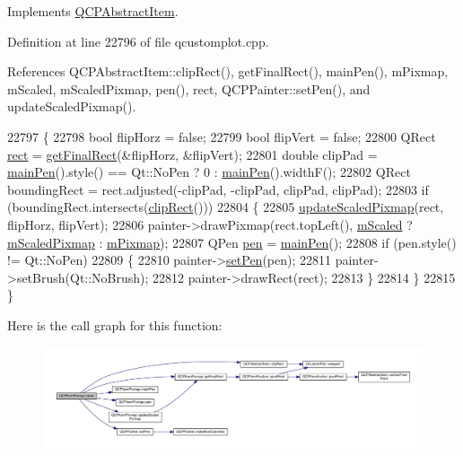 Implements \hyperlink{class_q_c_p_abstract_item_ad0dc056f650c3ca73414e6b4f01674ef}{Q\+C\+P\+Abstract\+Item}.



Definition at line 22796 of file qcustomplot.\+cpp.



References Q\+C\+P\+Abstract\+Item\+::clip\+Rect(), get\+Final\+Rect(), main\+Pen(), m\+Pixmap, m\+Scaled, m\+Scaled\+Pixmap, pen(), rect, Q\+C\+P\+Painter\+::set\+Pen(), and update\+Scaled\+Pixmap().


\begin{DoxyCode}
22797 \{
22798   \textcolor{keywordtype}{bool} flipHorz = \textcolor{keyword}{false};
22799   \textcolor{keywordtype}{bool} flipVert = \textcolor{keyword}{false};
22800   QRect \hyperlink{_gen_blob_8m_aea8f6815d9a63491fc422c5572c6b3c3}{rect} = \hyperlink{class_q_c_p_item_pixmap_a245ef0c626cab7096a810442f2f6a2d9}{getFinalRect}(&flipHorz, &flipVert);
22801   \textcolor{keywordtype}{double} clipPad = \hyperlink{class_q_c_p_item_pixmap_af21085516585c475dc9d839e7f377233}{mainPen}().style() == Qt::NoPen ? 0 : \hyperlink{class_q_c_p_item_pixmap_af21085516585c475dc9d839e7f377233}{mainPen}().widthF();
22802   QRect boundingRect = rect.adjusted(-clipPad, -clipPad, clipPad, clipPad);
22803   \textcolor{keywordflow}{if} (boundingRect.intersects(\hyperlink{class_q_c_p_abstract_item_a538e25ff8856534582f5b2b400a46405}{clipRect}()))
22804   \{
22805     \hyperlink{class_q_c_p_item_pixmap_a8bced3027b326b290726cd1979c7cfc6}{updateScaledPixmap}(rect, flipHorz, flipVert);
22806     painter->drawPixmap(rect.topLeft(), \hyperlink{class_q_c_p_item_pixmap_a8fe670a529cd46a9b8afd9fc1203bc3f}{mScaled} ? \hyperlink{class_q_c_p_item_pixmap_a2ebc66e15b9f1264563d58f29ba1bc00}{mScaledPixmap} : 
      \hyperlink{class_q_c_p_item_pixmap_a1396cce7f26c7b8e9512906284380c4d}{mPixmap});
22807     QPen \hyperlink{class_q_c_p_item_pixmap_ab2b821c80cfade589472e933b9c4361f}{pen} = \hyperlink{class_q_c_p_item_pixmap_af21085516585c475dc9d839e7f377233}{mainPen}();
22808     \textcolor{keywordflow}{if} (pen.style() != Qt::NoPen)
22809     \{
22810       painter->\hyperlink{class_q_c_p_painter_af9c7a4cd1791403901f8c5b82a150195}{setPen}(pen);
22811       painter->setBrush(Qt::NoBrush);
22812       painter->drawRect(rect);
22813     \}
22814   \}
22815 \}
\end{DoxyCode}


Here is the call graph for this function\+:\nopagebreak
\begin{figure}[H]
\begin{center}
\leavevmode
\includegraphics[width=350pt]{class_q_c_p_item_pixmap_a879e8076c2db01a38b34cfa73ec95d2f_cgraph}
\end{center}
\end{figure}


